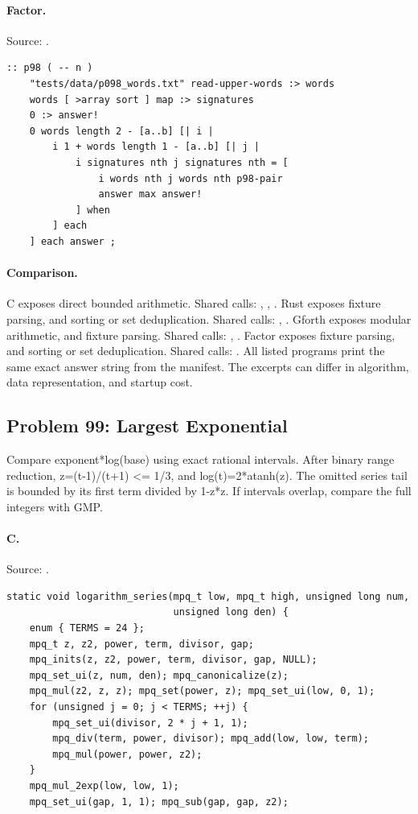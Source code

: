 \paragraph{Factor.} Source: .
\begin{lstlisting}
:: p98 ( -- n )
    "tests/data/p098_words.txt" read-upper-words :> words
    words [ >array sort ] map :> signatures
    0 :> answer!
    0 words length 2 - [a..b] [| i |
        i 1 + words length 1 - [a..b] [| j |
            i signatures nth j signatures nth = [
                i words nth j words nth p98-pair
                answer max answer!
            ] when
        ] each
    ] each answer ;
\end{lstlisting}

\paragraph{Comparison.}
C exposes direct bounded arithmetic. Shared calls: \texttt{}, \texttt{}, \texttt{}. Rust exposes fixture parsing, and sorting or set deduplication. Shared calls: \texttt{}, \texttt{}. Gforth exposes modular arithmetic, and fixture parsing. Shared calls: \texttt{}, \texttt{}. Factor exposes fixture parsing, and sorting or set deduplication. Shared calls: \texttt{}.
All listed programs print the same exact answer string from the manifest. The excerpts can differ in algorithm, data representation, and startup cost.

\subsection{Problem 99: Largest Exponential}
\label{walkthrough:p99}
Compare exponent*log(base) using exact rational intervals. After binary range reduction, z=(t-1)/(t+1) <= 1/3, and log(t)=2*atanh(z). The omitted series tail is bounded by its first term divided by 1-z*z. If intervals overlap, compare the full integers with GMP.

\paragraph{C.} Source: .
\begin{lstlisting}
static void logarithm_series(mpq_t low, mpq_t high, unsigned long num,
                             unsigned long den) {
    enum { TERMS = 24 };
    mpq_t z, z2, power, term, divisor, gap;
    mpq_inits(z, z2, power, term, divisor, gap, NULL);
    mpq_set_ui(z, num, den); mpq_canonicalize(z);
    mpq_mul(z2, z, z); mpq_set(power, z); mpq_set_ui(low, 0, 1);
    for (unsigned j = 0; j < TERMS; ++j) {
        mpq_set_ui(divisor, 2 * j + 1, 1);
        mpq_div(term, power, divisor); mpq_add(low, low, term);
        mpq_mul(power, power, z2);
    }
    mpq_mul_2exp(low, low, 1);
    mpq_set_ui(gap, 1, 1); mpq_sub(gap, gap, z2);
\end{lstlisting}


